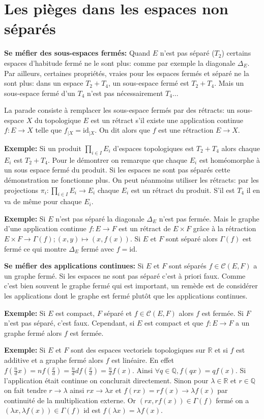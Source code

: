 \documentclass[a4paper, 11pt, french]{book}
\theoremstyle{plain} %
\theoremstyle{definition} %
\theoremstyle{remark} %
\newcommand{\1}{\mathds{1}}
\newcommand{\id}{\mathrm{id}}
\newcommand{\cont}{\mathcal{C}}
\newcommand{\Q}{\mathbb{Q}}
\newcommand{\R}{\mathbb{R}}
\begin{document}
\section{Les pièges dans les espaces non séparés}

\textbf{Se méfier des sous-espaces fermés:}
Quand $E$ n'est pas séparé ($T_2$) certains espaces d'habitude fermé ne le sont plus: comme par exemple la diagonale $\Delta_E$.
Par ailleurs, certaines propriétés, vraies pour les espaces fermés et séparé ne la sont plus: dans un espace $T_2+T_4$, un sous-espace fermé est $T_2+T_4$.
Mais un sous-espace fermé d'un $T_4$ n'est pas nécessairement $T_4$...

La parade consiste à remplacer les sous-espace fermés par des rétracts: un sous-espace $X$ du topologique $E$ est un rétract s'il existe une application continue $f:E\rightarrow X$ telle que $f_{\vert X}=\id_{\vert X}$.
On dit alors que $f$ est une rétraction $E\rightarrow X$.

\textbf{Exemple:}
Si un produit $\prod_{i\in I}E_i$ d'espaces topologiques est $T_2+T_4$ alors chaque $E_i$ est $T_2+T_4$.
Pour le démontrer on remarque que chaque $E_i$ est homéomorphe à un sous espace fermé du produit.
Si les espaces ne sont pas séparés cette démonstration ne fonctionne plus.
On peut néanmoins utiliser les rétracts: par les projections $\pi_i:\prod_{i\in I}E_i\rightarrow E_i$ chaque $E_i$ est un rétract du produit.
S'il est $T_4$ il en va de même pour chaque $E_i$.

\textbf{Exemple:}
Si $E$ n'est pas séparé la diagonale $\Delta_E$ n'est pas fermée.
Mais le graphe d'une application continue $f:E\rightarrow F$ est un rétract de $E\times F$ grâce à la rétraction $E\times F\rightarrow\Gamma(f); (x, y)\mapsto(x, f(x))$.
Si $E$ et $F$ sont séparé alors $\Gamma(f)$ est fermé ce qui montre $\Delta_E$ fermé avec $f=\id$.

\textbf{Se méfier des applications continues:}
Si $E$ et $F$ sont séparés $f\in\cont(E, F)$ a un graphe fermé.
Si les espaces ne sont pas séparé c'est à priori faux.
Comme c'est bien souvent le graphe fermé qui est important, un remède est de considérer les applications dont le graphe est fermé plutôt que les applications continues.

\textbf{Exemple:}
Si $E$ est compact, $F$ séparé et $f\in\cont(E, F)$ alors $f$ est fermée.
Si $F$ n'est pas séparé, c'est faux.
Cependant, si $E$ est compact et que $f:E\rightarrow F$ a un graphe fermé alors $f$ est fermée.

\textbf{Exemple:}
Si $E$ et $F$ sont des espaces vectoriels topologiques sur $\R$ et si $f$ est additive et a graphe fermé alors $f$ est linéaire.
En effet $f(\frac{n}{d}x)=nf(\frac{x}{d})=\frac{n}{d}df(\frac{x}{d})=\frac{n}{d}f(x)$.
Ainsi $\forall q\in\Q, f(qx)=qf(x)$.
Si l'application était continue on conclurait directement.
Sinon pour $\lambda\in\R$ et $r\in\Q$ on fait tendre $r\rightarrow\lambda$ ainsi $rx\rightarrow\lambda x$ et $f(rx)=rf(x)\rightarrow\lambda f(x)$ par continuité de la multiplication externe.
Or $(rx, rf(x))\in\Gamma(f)$ fermé on a $(\lambda x, \lambda f(x))\in\Gamma(f)$ id est $f(\lambda x)=\lambda f(x)$.
\end{document}
